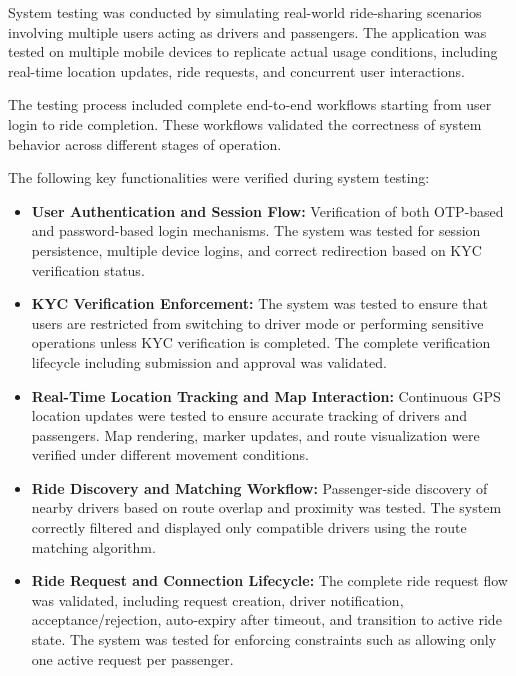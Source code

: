 \documentclass[10pt,a4paper]{report}
\begin{document}
\justify\large System testing was conducted by simulating real-world ride-sharing scenarios involving multiple users acting as drivers and passengers. The application was tested on multiple mobile devices to replicate actual usage conditions, including real-time location updates, ride requests, and concurrent user interactions.

\justify\large The testing process included complete end-to-end workflows starting from user login to ride completion. These workflows validated the correctness of system behavior across different stages of operation.

\justify\large The following key functionalities were verified during system testing:

\begin{itemize}

\item \textbf{User Authentication and Session Flow:}
Verification of both OTP-based and password-based login mechanisms. The system was tested for session persistence, multiple device logins, and correct redirection based on KYC verification status.

\item \textbf{KYC Verification Enforcement:}
The system was tested to ensure that users are restricted from switching to driver mode or performing sensitive operations unless KYC verification is completed. The complete verification lifecycle including submission and approval was validated.

\item \textbf{Real-Time Location Tracking and Map Interaction:}
Continuous GPS location updates were tested to ensure accurate tracking of drivers and passengers. Map rendering, marker updates, and route visualization were verified under different movement conditions.

\item \textbf{Ride Discovery and Matching Workflow:}
Passenger-side discovery of nearby drivers based on route overlap and proximity was tested. The system correctly filtered and displayed only compatible drivers using the route matching algorithm.

\item \textbf{Ride Request and Connection Lifecycle:}
The complete ride request flow was validated, including request creation, driver notification, acceptance/rejection, auto-expiry after timeout, and transition to active ride state. The system was tested for enforcing constraints such as allowing only one active request per passenger.


\end{itemize}
\end{document}
